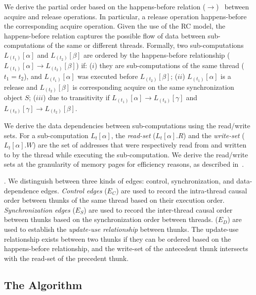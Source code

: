 We derive the partial order based on the happens-before relation
($\rightarrow$)~\cite{djit,fast-track-pldi} between acquire and release operations. In particular, a release
operation happens-before the corresponding acquire operation. Given
the use of the RC model, the happens-before relation
captures the possible flow of data between sub-computations of the same or different threads.
Formally, two sub-computations $L_{(t_1)}[\alpha]$ and
$L_{(t_2)}[\beta]$ are ordered by the happens-before relationship ($L_{(t_1)}[\alpha] \rightarrow
L_{(t_2)}[\beta]$) if:  ($i$)  they are sub-computations of the
same thread ($t_1 = t_2$), and $L_{(t_1)}[\alpha]$ was executed before $L_{(t_2)}[\beta]$; ($ii$)  $L_{(t_1)}[\alpha]$  is a release and $L_{(t_2)}[\beta]$ is corresponding acquire on the same synchronization object $S$; ($iii$) due to transitivity if  
 $L_{(t_1)}[\alpha] \rightarrow L_{(t_3)}[\gamma] $ and $L_{(t_3)}[\gamma]  \rightarrow L_{(t_2)}[\beta]$.


 We derive the data dependencies between sub-computations using the read/write sets. For a sub-computation $L_t[\alpha]$, the {\em read-set}
($L_t[\alpha].R$) and the {\em write-set} ($L_t[\alpha].W$) are the set of
addresses that were respectively read from and written to by
the thread while executing the sub-computation. We derive the read/write sets at the granularity of memory pages for efficiency reasons, as described in~.

.
We distinguish between three kinds of edges: control, synchronization, and data-dependence edges.
{\em Control edges} ($E_{C}$) are used to record the intra-thread causal order between thunks of the same thread
based on their execution order. {\em Synchronization edges}  ($E_{S}$) are
used to record the inter-thread causal order between thunks based on the synchronization order between threads. ($E_{D}$) are used to establish the {\em update-use relationship} between thunks. The update-use relationship exists between two thunks if they can be  ordered based on the happens-before relationship, and the write-set of the  antecedent thunk intersects with the read-set of the precedent thunk.



 
 
 \subsection{ The Algorithm}

